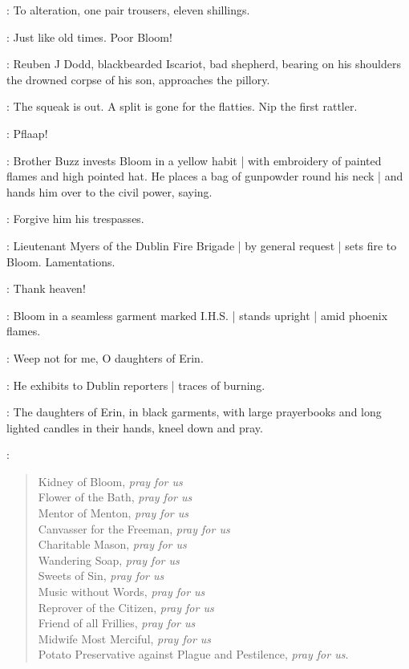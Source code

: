\Mesias:
To alteration,
one pair trousers,
eleven shillings.

\Bloom:
Just like old times.
Poor Bloom!

:
Reuben J Dodd,
blackbearded Iscariot,
bad shepherd,
bearing on his shoulders the drowned corpse of his son,
approaches the pillory.%

\ReubenJ:
The squeak is out.
A split is gone for the flatties.
Nip the first rattler.

\FireBrigade:
Pflaap!

:
Brother Buzz invests Bloom in a yellow habit |
with embroidery of painted flames and high pointed hat.
He places a bag of gunpowder round his neck |
and hands him over to the civil power,
saying.

\BrotherBuzz:
Forgive him his trespasses.

:
Lieutenant Myers of the Dublin Fire Brigade |
by general request |
sets fire to Bloom.
Lamentations.

\Citizen[1]:
Thank heaven!

:
Bloom in a seamless garment marked I.H.S. |
stands upright |
amid phoenix flames.

\Bloom:
Weep not for me,
O daughters of Erin.

:
He exhibits to Dublin reporters |
traces of burning.

:
The daughters of Erin,
in black garments,
with large prayerbooks and long lighted candles in their hands,
kneel down and pray.

\DaughtersErin:
\begin{verse}
    Kidney of Bloom, \emph{pray for us}\\
    Flower of the Bath, \emph{pray for us}\\
    Mentor of Menton, \emph{pray for us}\\
    Canvasser for the Freeman, \emph{pray for us}\\
    Charitable Mason, \emph{pray for us}\\
    Wandering Soap, \emph{pray for us}\\
    Sweets of Sin, \emph{pray for us}\\
    Music without Words, \emph{pray for us}\\
    Reprover of the Citizen, \emph{pray for us}\\
%
    Friend of all Frillies, \emph{pray for us}\\
    Midwife Most Merciful, \emph{pray for us}\\
    Potato Preservative against Plague and Pestilence, \emph{pray for us}.
\end{verse}

